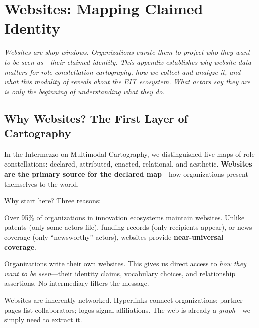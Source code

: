 \chapter{Websites: Mapping Claimed Identity}
\label{app:websites}

\noindent\textit{Websites are shop windows. Organizations curate them to project who they want to be seen as---their claimed identity. This appendix establishes why website data matters for role constellation cartography, how we collect and analyze it, and what this modality of \RoleBox reveals about the EIT ecosystem. What actors say they are is only the beginning of understanding what they do.}

\bigskip


\section*{Why Websites? The First Layer of Cartography}

In the Intermezzo on Multimodal Cartography, we distinguished five maps of role constellations: declared, attributed, enacted, relational, and aesthetic. \textbf{Websites are the primary source for the declared map}---how organizations present themselves to the world.


Why start here? Three reasons:

\begin{description}[leftmargin=0.5cm, itemsep=0.4em]
\item[Ubiquity.] Over 95\% of organizations in innovation ecosystems maintain websites. Unlike patents (only some actors file), funding records (only recipients appear), or news coverage (only ``newsworthy'' actors), websites provide \textbf{near-universal coverage}.

\item[Self-authorship.] Organizations write their own websites. This gives us direct access to \emph{how they want to be seen}---their identity claims, vocabulary choices, and relationship assertions. No intermediary filters the message.

\item[Relationality.] Websites are inherently networked. Hyperlinks connect organizations; partner pages list collaborators; logos signal affiliations. The web is already a \emph{graph}---we simply need to extract it.
\end{description}

